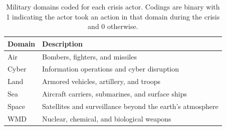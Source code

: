 \documentclass[
]{article}
\begin{document}
\begin{table}[]
\centering
\begin{tabular}{|l|l|}
\hline
\textbf{Domain} & \textbf{Description} \\
\hline
Air & Bombers, fighters, and missiles \\
Cyber & Information operations and cyber disruption \\
Land & Armored vehicles, artillery, and troops \\
Sea & Aircraft carriers, submarines, and surface ships \\
Space & Satellites and surveillance beyond the earth's atmosphere \\
WMD & Nuclear, chemical, and biological weapons \\ 
\hline
\end{tabular}
\caption{Military domains coded for each crisis actor. Codings are binary with 1 indicating the actor took an action in that domain during the crisis and 0 otherwise.}
\label{tab:domains}
\end{table}
\end{document}
